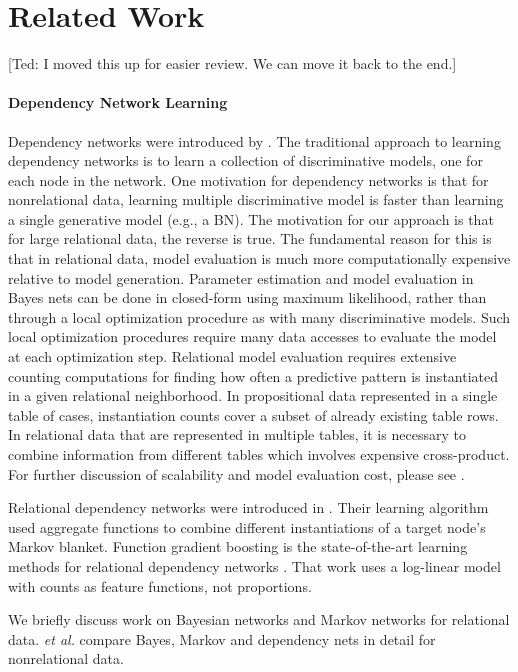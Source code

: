 \documentclass[runningheads,a4paper]{llncs}
\begin{document}
\section{Related Work} \label{sec:related} [Ted: I moved this up for easier review. We can move it back to the end.]

\paragraph{Dependency Network Learning} Dependency networks were introduced by \cite{Heckerman2000}. The traditional approach to learning dependency networks is to learn a collection of discriminative models, one for each node in the network. One motivation for dependency networks is that for nonrelational data, learning multiple discriminative model is faster than learning a single generative model (e.g., a BN). The motivation for our approach is that for large relational data, the reverse is true. The fundamental reason for this is that in relational data, model evaluation is much more computationally expensive relative to  model generation. Parameter estimation and model evaluation in Bayes nets can be done in closed-form using maximum likelihood, rather than through a local optimization procedure as with many discriminative models. Such local optimization procedures require many data accesses to evaluate the model at each optimization step.
Relational model evaluation requires extensive counting computations for finding how often a predictive pattern is instantiated in a given relational neighborhood. In propositional data represented in a single table of cases, instantiation counts cover a subset of already existing table rows. In relational data that are represented in multiple tables, it is necessary to combine information from different tables which involves expensive cross-product. For further  discussion of scalability and model evaluation cost, please see \cite{Neville2007}.

Relational dependency networks were introduced in \cite{Neville2007}. Their learning algorithm used aggregate functions to combine different instantiations of a target node's Markov blanket. Function gradient boosting is the state-of-the-art learning methods for relational dependency networks \cite{Khot2011}. That work uses a log-linear model with counts as feature functions, not proportions. 

We briefly discuss work on Bayesian networks and Markov networks for relational data. \cite{Heckerman2000} {\em et al.} compare Bayes, Markov and dependency nets in detail for nonrelational data. 
\end{document}
